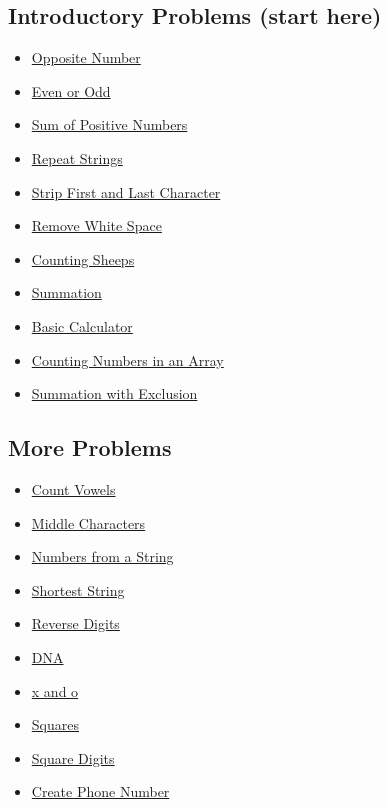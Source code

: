 \documentclass[12pt, a4paper]{article}
\begin{document}
\subsection{Introductory Problems (start here)}
\label{sec:orgb30120a}
\begin{itemize}
\item \href{https://www.codewars.com/kata/56dec885c54a926dcd001095}{Opposite Number}
\item \href{https://www.codewars.com/kata/53da3dbb4a5168369a0000fe}{Even or Odd}
\item \href{https://www.codewars.com/kata/5715eaedb436cf5606000381}{Sum of Positive Numbers}
\item \href{https://www.codewars.com/kata/57a0e5c372292dd76d000d7e}{Repeat Strings}
\item \href{https://www.codewars.com/kata/56bc28ad5bdaeb48760009b0}{Strip First and Last Character}
\item \href{https://www.codewars.com/kata/remove-string-spaces/python}{Remove White Space}
\item \href{https://www.codewars.com/kata/54edbc7200b811e956000556}{Counting Sheeps}
\item \href{https://www.codewars.com/kata/55d24f55d7dd296eb9000030}{Summation}
\item \href{https://www.codewars.com/kata/57356c55867b9b7a60000bd7}{Basic Calculator}
\item \href{https://www.codewars.com/kata/576bb71bbbcf0951d5000044}{Counting Numbers in an Array}
\item \href{https://www.codewars.com/kata/576b93db1129fcf2200001e6}{Summation with Exclusion}
\end{itemize}
\subsection{More Problems}
\label{sec:org9a61f3b}
\begin{itemize}
\item \href{https://www.codewars.com/kata/54ff3102c1bad923760001f3}{Count Vowels}
\item \href{https://www.codewars.com/kata/56747fd5cb988479af000028}{Middle Characters}
\item \href{https://www.codewars.com/kata/554b4ac871d6813a03000035}{Numbers from a String}
\item \href{https://www.codewars.com/kata/57cebe1dc6fdc20c57000ac9}{Shortest String}
\item \href{https://www.codewars.com/kata/5467e4d82edf8bbf40000155}{Reverse Digits}
\item \href{https://www.codewars.com/kata/554e4a2f232cdd87d9000038}{DNA}
\item \href{https://www.codewars.com/kata/55908aad6620c066bc00002a}{x and o}
\item \href{https://www.codewars.com/kata/54c27a33fb7da0db0100040e}{Squares}
\item \href{https://www.codewars.com/kata/546e2562b03326a88e000020}{Square Digits}
\item \href{https://www.codewars.com/kata/525f50e3b73515a6db000b83}{Create Phone Number}
\end{itemize}
\end{document}
